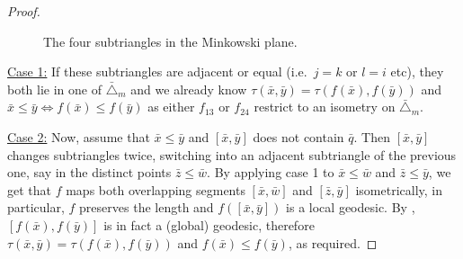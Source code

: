 \documentclass[11pt,reqno]{amsart}
\theoremstyle{definition}
\theoremstyle{definition}
\theoremstyle{plain}
\theoremstyle{remark}
\begin{document}
\begin{proof}
\begin{figure}
\begin{center}
\end{center}
\caption{The four subtriangles in the Minkowski plane.}
\label{fig: planar quadrangle four subtriangles}
\end{figure}

\underline{Case 1:} If these subtriangles are adjacent or equal (i.e.\ $j=k$ or $l=i$ etc), they both lie in one of $\bar\triangle_m$ and we already know $\tau(\bar x,\bar y)=\tau(f(\bar x),f(\bar y))$ and $\bar x\leq\bar y\Leftrightarrow f(\bar x)\leq f(\bar y)$ as either $f_{13}$ or $f_{24}$ restrict to an isometry on $\bar\triangle_m$. 

\underline{Case 2:} Now, assume that $\bar x\leq\bar y$ and $[\bar x,\bar y]$ does not contain $\bar q$. Then $[\bar x,\bar y]$ changes subtriangles twice, switching into an adjacent subtriangle of the previous one, say in the distinct points $\bar z \leq \bar w$. By applying case 1 to $\bar x\leq \bar w$ and $\bar z\leq\bar y$, we get that $f$ maps both overlapping segments $[\bar x,\bar w]$ and $[\bar z,\bar y]$ isometrically, in particular, $f$ preserves the length and $f([\bar x,\bar y])$ is a local geodesic. By \cite[Remark 2.6]{erös-gieger2025}, $[f(\bar x),f(\bar y)]$ is in fact a (global) geodesic, therefore $\tau(\bar x,\bar y)=\tau(f(\bar x),f(\bar y))$ and $f(\bar x)\leq f(\bar y)$, as required.


\end{proof}
\end{document}
